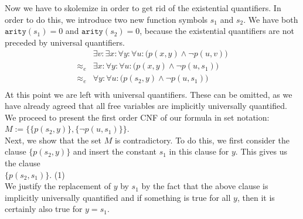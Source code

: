 Now we have to skolemize in order to get rid of the existential quantifiers.
In order to do this, we introduce two new function symbols $s_1$ and $s_2$. 
We have both  $\mathtt{arity}(s_1) = 0$ and $\mathtt{arity}(s_2) = 0$, because the existential quantifiers are
not preceded by universal quantifiers.
$$
\begin{array}{ll}
           & \exists v\colon  \exists x\colon \forall y\colon \forall u\colon \Big( p(x,y) \wedge \neg p(u,v) \Big)\\
 \approx_e & \exists x\colon \forall y\colon \forall u\colon \Big( p(x,y) \wedge \neg p(u,s_1) \Big)\\
 \approx_e & \forall y\colon \forall u\colon \Big( p(s_2,y) \wedge \neg p(u,s_1) \Big)\\
\end{array}
$$
At this point we are left with  universal quantifiers.  These can be omitted,
as we have already agreed that all free variables are implicitly universally quantified.
We proceed to present the first order CNF of our formula in set notation:
\\[0.2cm] 
\hspace*{1.3cm}
$M := \Big\{ \big\{ p(s_2,y) \big\}, \big\{\neg p(u,s_1)\big\}\Big\}$.
\\[0.2cm]
Next, we show that the set $M$ is contradictory.
To do this, we first consider the clause $\big\{ p(s_2,y) \big\}$ and insert 
the constant $s_1$ in this clause for $y$.  This gives us the clause \\[0.2cm]
\hspace*{1.3cm} $\big\{ p(s_2,s_1) \big\}$. \hspace*{\fill}(1)\\[0.2cm]
We justify the replacement of $y$ by $s_1$ by the fact that the above clause is implicitly
universally quantified and if something is true for all $y$, then it is certainly also true for $y = s_1$.


